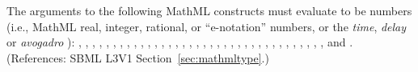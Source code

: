 The arguments to the following MathML constructs must evaluate to be
numbers (i.e., MathML real, integer, rational, or ``e-notation'' numbers,
or the \emph{time}, \emph{delay} or \emph{avogadro} ):
, , , ,
, , , ,
, , , ,
, , , , ,
, , , , ,
, , , , ,
, , , , ,
, , , , and .
(References: SBML L3V1 Section~\ref{sec:mathmltype}.)

